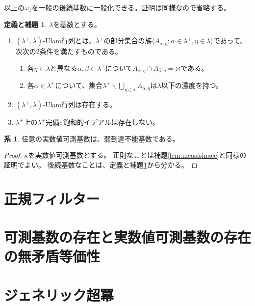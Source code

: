 \documentclass[uplatex]{jsarticle}
\newcommand{\seq}[1]{{\langle#1\rangle}}
\renewcommand\emptyset{\varnothing}
\renewcommand{\setminus}{\smallsetminus}
\theoremstyle{definition}
\newtheorem{cor}[thm]{系}
\newtheorem{defiandlem}[thm]{定義と補題}
\begin{document}
	以上の$\omega_1$を一般の後続基数に一般化できる。証明は同様なので省略する。
	
	\begin{defiandlem}\label{dl:lambdaplusulam}
		$\lambda$を基数とする。
		\begin{enumerate}
			\item $(\lambda^+, \lambda)$-Ulam行列とは、$\lambda^+$の部分集合の族$\seq{ A_{\alpha, \eta} : \alpha \in \lambda^+, \eta \in \lambda }$であって、次次の2条件を満たすものである。
			\begin{enumerate}
				\item 各$\eta \in \lambda$と異なる$\alpha, \beta \in \lambda^+$について$A_{\alpha,\eta} \cap A_{\beta,\eta} = \emptyset$である。
				\item 各$\alpha \in \lambda^+$について、集合$\lambda^+ \setminus \bigcup_{\eta \in \lambda} A_{\alpha,\eta}$は$\lambda$以下の濃度を持つ。
			\end{enumerate}
			\item $(\lambda^+, \lambda)$-Ulam行列は存在する。
			\item $\lambda^+$上の$\lambda^+$完備$\sigma$飽和的イデアルは存在しない。
		\end{enumerate}
	\end{defiandlem}

	\begin{cor}
		任意の実数値可測基数は、弱到達不能基数である。
	\end{cor}
	\begin{proof}
		$\kappa$を実数値可測基数とする。
		正則なことは補題\ref{lem:measisinacc}と同様の証明でよい。
		後続基数なことは、定義と補題\ref{dl:lambdaplusulam}から分かる。
	\end{proof}
	
	\section{正規フィルター}
	
	\section{可測基数の存在と実数値可測基数の存在の無矛盾等価性}
	
	\section{ジェネリック超冪}
	
	\nocite{*}
	\printbibliography[title={参考文献}]
	
\end{document}
